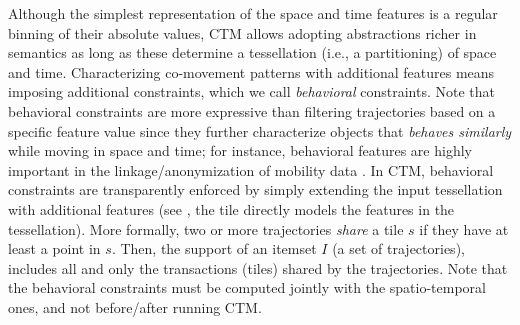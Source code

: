 \documentclass[
]{ceurart}
\begin{document}
Although the simplest representation of the space and time features is a regular binning of their absolute values, CTM allows adopting abstractions richer in semantics as long as these determine a tessellation (i.e., a partitioning) of space and time.
%
%
Characterizing co-movement patterns with additional features means imposing additional constraints, which we call \textit{behavioral} constraints. 
Note that behavioral constraints are more expressive than filtering trajectories based on a specific feature value since they further characterize objects that \textit{behaves similarly} while moving in space and time; for instance, behavioral features are highly important in the linkage/anonymization of mobility data \citep{DBLP:journals/tkde/JinHFCOZ23}.
In CTM, behavioral constraints are transparently enforced by simply extending the input tessellation with additional features (see , the tile directly models the features in the tessellation).
More formally, two or more trajectories \textit{share} a tile $s$ if they have at least a point in $s$. Then, the support of an itemset $I$ (a set of trajectories), includes all and only the transactions (tiles) shared by the trajectories.
Note that the behavioral constraints must be computed jointly with the spatio-temporal ones, and not before/after running CTM.
\end{document}

